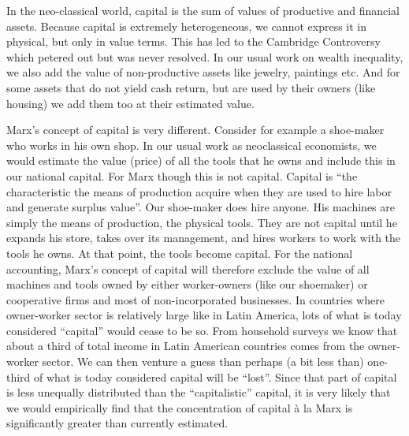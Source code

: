 \documentclass[
]{book}
\begin{document}
In the neo-classical world, capital is the sum of values of productive and financial assets. Because capital is extremely heterogeneous, we cannot express it in physical, but only in value terms. This has led to the Cambridge Controversy which petered out but was never resolved. In our usual work on wealth inequality, we also add the value of non-productive assets like jewelry, paintings etc. And for some assets that do not yield cash return, but are used by their owners (like housing) we add them too at their estimated value.

Marx's concept of capital is very different. Consider for example a shoe-maker who works in his own shop. In our usual work as neoclassical economists, we would estimate the value (price) of all the tools that he owns and include this in our national capital. For Marx though this is not capital. Capital is ``the characteristic the means of production acquire when they are used to hire labor and generate surplus value''. Our shoe-maker does hire anyone. His machines are simply the means of production, the physical tools. They are not capital until he expands his store, takes over its management, and hires workers to work with the tools he owns. At that point, the tools become capital. For the national accounting, Marx's concept of capital will therefore exclude the value of all machines and tools owned by either worker-owners (like our shoemaker) or cooperative firms and most of non-incorporated businesses. In countries where owner-worker sector is relatively large like in Latin America, lots of what is today considered ``capital'' would cease to be so. From household surveys we know that about a third of total income in Latin American countries comes from the owner-worker sector. We can then venture a guess than perhaps (a bit less than) one-third of what is today considered capital will be ``lost''. Since that part of capital is less unequally distributed than the ``capitalistic'' capital, it is very likely that we would empirically find that the concentration of capital à la Marx is significantly greater than currently estimated.
\end{document}
